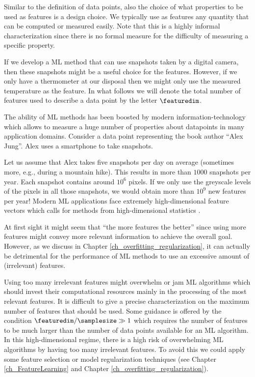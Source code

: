 \documentclass[12pt]{report}
\newcommand{\featurelen}{\featuredim}
\begin{document}
Similar to the definition of data points, also the choice of what properties 
to be used as features is a design choice. We typically use as features any 
quantity that can be computed or measured easily. Note that this is a highly 
informal characterization since there is no formal measure for the difficulty 
of measuring a specific property. 

If we develop a ML method that can use snapshots taken by a digital 
camera, then these snapshots might be a useful choice for the features. 
However, if we only have a thermometer at our disposal then we might 
only use the measured temperature as the feature. In what follows we 
will denote the total number of features used to describe a data point 
by the letter $\featurelen$. 

The ability of ML methods has been boosted by modern information-technology 
which allows to measure a huge number of properties about datapoints 
in many application domains. Consider a data point representing the book 
author ``Alex Jung''. Alex uses a smartphone to take snapshots. 

Let us assume that Alex takes five snapshots per day on average (sometimes 
more, e.g., during a mountain hike). This results in more than $1000$ 
snapshots per year. Each snapshot contains around $10^{6}$ pixels. 
If we only use the greyscale levels of the pixels in all those snapshots, 
we would obtain more than $10^{9}$ new features per year! Modern ML 
applications face extremely high-dimensional feature vectors which calls 
for methods from high-dimensional statistics \cite{BuhlGeerBook,Wain2019}. 

At first sight it might seem that ``the more features the better'' 
since using more features might convey more relevant information 
to achieve the overall goal. However, as we discuss in Chapter \ref{ch_overfitting_regularization}, 
it can actually be detrimental for the performance of ML methods 
to use an excessive amount of (irrelevant) features. 

Using too many irrelevant features might overwhelm or jam ML 
algorithms which should invest their computational resources 
mainly in the processing of the most relevant features. It is difficult 
to give a precise characterization on the maximum number of 
features that should be used. Some guidance is offered by the 
condition $\featurelen/\samplesize \gg 1$ which requires the number 
of features to be much larger than the number of data points 
available for an ML algorithm. In this high-dimensional regime, 
there is a high risk of overwhelming ML algorithms by having 
too many irrelevant features. To avoid this we could apply some 
feature selection or model regularization techniques (see Chapter \ref{ch_FeatureLearning} 
and Chapter \ref{ch_overfitting_regularization}). 
\end{document}
